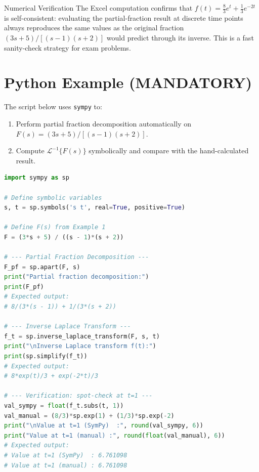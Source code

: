 \documentclass[12pt,a4paper]{article}
\begin{document}
\begin{learnbox}{Numerical Verification}
The Excel computation confirms that $f(t) = \frac{8}{3}e^{t}+\frac{1}{3}e^{-2t}$
is self-consistent: evaluating the partial-fraction result at discrete time
points always reproduces the same values as the original fraction $(3s+5)/[(s-1)(s+2)]$
would predict through its inverse.  This is a fast sanity-check strategy for exam problems.
\end{learnbox}

\section{Python Example (MANDATORY)}

The script below uses \texttt{sympy} to:
\begin{enumerate}[leftmargin=*, label=\arabic*.]
    \item Perform partial fraction decomposition automatically on
          $F(s) = (3s+5)/[(s-1)(s+2)]$.
    \item Compute $\mathcal{L}^{-1}\{F(s)\}$ symbolically and compare with the
          hand-calculated result.
\end{enumerate}

\begin{lstlisting}[language=Python, caption={Symbolic inverse Laplace via SymPy}]
import sympy as sp

# Define symbolic variables
s, t = sp.symbols('s t', real=True, positive=True)

# Define F(s) from Example 1
F = (3*s + 5) / ((s - 1)*(s + 2))

# --- Partial Fraction Decomposition ---
F_pf = sp.apart(F, s)
print("Partial fraction decomposition:")
print(F_pf)
# Expected output:
# 8/(3*(s - 1)) + 1/(3*(s + 2))

# --- Inverse Laplace Transform ---
f_t = sp.inverse_laplace_transform(F, s, t)
print("\nInverse Laplace transform f(t):")
print(sp.simplify(f_t))
# Expected output:
# 8*exp(t)/3 + exp(-2*t)/3

# --- Verification: spot-check at t=1 ---
val_sympy = float(f_t.subs(t, 1))
val_manual = (8/3)*sp.exp(1) + (1/3)*sp.exp(-2)
print("\nValue at t=1 (SymPy)  :", round(val_sympy, 6))
print("Value at t=1 (manual) :", round(float(val_manual), 6))
# Expected output:
# Value at t=1 (SymPy)  : 6.761098
# Value at t=1 (manual) : 6.761098
\end{lstlisting}
\end{document}
